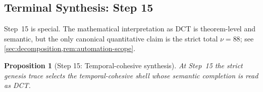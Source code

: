 \documentclass[11pt,a4paper]{article}
\theoremstyle{plain}
\newtheorem{proposition}[theorem]{Proposition}
\theoremstyle{definition}
\theoremstyle{remark}
\begin{document}
\subsection{Terminal Synthesis: Step 15}
\label{subsec:genesis-terminal-proof}

Step~15 is special.
The mathematical interpretation as DCT is theorem-level and semantic, but the
only canonical quantitative claim is the strict total $\nu=88$;
see \cref{sec:decomposition,rem:automation-scope}.

\begin{proposition}[Step 15: Temporal-cohesive synthesis]
\label{prop:genesis-step15}
At Step~15 the strict genesis trace selects the temporal-cohesive shell whose
semantic completion is read as DCT.
\end{proposition}
\end{document}
